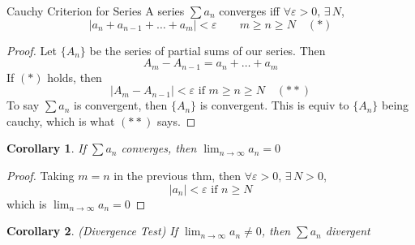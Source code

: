 \documentclass{article}
\newcommand{\e}{\varepsilon}
\newcommand{\ex}{\exists\,}
\newtheorem{corollary}{Corollary}
\begin{document}
\noindent\begin{theorem}{Cauchy Criterion for Series}{}
   A series $\sum a_n$ converges iff $\forall \e > 0,\,\ex N$,
   $$ |a_n + a_{n-1} +\dots + a_m| < \e \qquad m \ge n \ge N \quad (*)$$
\end{theorem}\vspace{10pt}

\begin{proof}
  Let $\{ A_n \}$ be the series of partial sums of our series. Then
  $${A_m - A_{n-1} = a_n + \dots + a_m}$$
  If $(*)$ holds, then
  $$|A_m - A_{n-1}| < \e \text{ if } m \ge n \ge N \quad (**)$$
  To say $\sum a_n$ is convergent, then $\{ A_n \}$ is convergent. This is equiv to $\{ A_n \}$ being cauchy, which is what $(**)$ says.
\end{proof}

\noindent\begin{corollary}{}{}
  If $\sum a_n$ converges, then $\displaystyle{\lim_{n\to\infty}{a_n} = 0}$
\end{corollary}\vspace{10pt}
\begin{proof}
  Taking $m = n$ in the previous thm, then $\forall\e > 0,\,\ex N > 0$,
  $$ |a_n| < \e \text{ if } n \ge N $$
  which is $\displaystyle{\lim_{n\to\infty}{a_n} = 0}$
\end{proof}

\noindent\begin{corollary}({Divergence Test}){}
  If $\displaystyle{\lim_{n\to\infty}{a_n}\neq 0}$, then $\sum a_n$ divergent
\end{corollary}\vspace{10pt}
\end{document}

